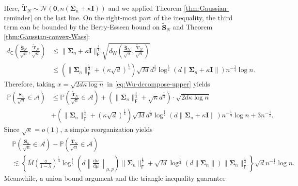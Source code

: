 Here, $\tilde{\bm{T}}_N \sim \mathcal{N}(\bm{0},n(\bm{\Sigma}_n +\kappa \bm{I}))$ and we applied Theorem \ref{thm:Gaussian-reminder} on the last line. On the right-most part of the inequality, the third term can be bounded by the Berry-Esseen bound on $\tilde{\bm{S}}_N$ and Theorem \ref{thm:Gaussian-convex-Wass}:
\begin{align*}
d_{\mathsf{C}}\left(\frac{\tilde{\bm{S}}_N}{\sqrt{n}},\frac{\tilde{\bm{T}}_N}{\sqrt{n}}\right)
&\leq \|\bm{\Sigma}_n + \kappa \bm{I}\|_{\mathsf{F}}^{\frac{1}{4}} \sqrt{d_{\mathsf{W}}\left(\frac{\tilde{\bm{S}}_N}{\sqrt{n}},\frac{\tilde{\bm{T}}_N}{\sqrt{n}}\right)} \\ 
&\leq \left(\|\bm{\Sigma}_n\|_{\mathsf{F}}^{\frac{1}{4}} +  (\kappa \sqrt{d})^{\frac{1}{4}}\right)\sqrt{M} d^{\frac{1}{2}}\log^{\frac{1}{2}} (d\|\bm{\Sigma}_n+\kappa \bm{I}\|) n^{-\frac{1}{4}}\log n.
\end{align*}
Therefore, taking $x = \sqrt{2d\kappa \log n}$ in \eqref{eq:Wu-decompose-upper} yields
\begin{align*}
\mathbb{P}\left(\frac{\bm{S}_n}{\sqrt{n}} \in \mathcal{A}\right)& \leq \mathbb{P}\left(\frac{\tilde{\bm{T}}_N}{\sqrt{n}} \in \mathcal{A} \right) + \left(\|\bm{\Sigma}_n\|_{\mathsf{F}}^{\frac{1}{2}} + \sqrt{\kappa} d^{\frac{1}{4}}\right) \cdot \sqrt{2d\kappa\log n} \\
&+ \left(\|\bm{\Sigma}_n\|_{\mathsf{F}}^{\frac{1}{4}} +  (\kappa \sqrt{d})^{\frac{1}{4}}\right)\sqrt{M} d^{\frac{1}{2}}\log^{\frac{1}{2}} (d\|\bm{\Sigma}_n+\kappa \bm{I}\|) n^{-\frac{1}{4}}\log n + 3n^{-\frac{1}{2}}.
\end{align*}
Since $\sqrt{\kappa} = o(1)$, a simple reorganization yields
\begin{align}\label{eq:Wu-upper-bound}
&  \mathbb{P}\left(\frac{\bm{S}_n}{\sqrt{n}} \in \mathcal{A}\right)- \mathbb{P}\left(\frac{\tilde{\bm{T}}_N}{\sqrt{n}} \in \mathcal{A} \right)\nonumber \\ 
&\lesssim \left\{\bar{M}\left(\frac{q}{1-\lambda}\right)^{\frac{1}{4}}\log^{\frac{1}{4}}\left(d\left\|\frac{\mathrm{d}\nu}{\mathrm{d}\mu}\right\|_{\mu,p}\right)\|\bm{\Sigma}_n\|_{\mathsf{F}}^{\frac{1}{2}}+ \sqrt{M} \log^{\frac{1}{2}} (d\|\bm{\Sigma}_n\|)\|\bm{\Sigma}_n\|_{\mathsf{F}}^{\frac{1}{4}}\right\} \sqrt{d}n^{-\frac{1}{4}}\log n.
\end{align}
Meanwhile, a union bound argument and the triangle inequality guarantee
